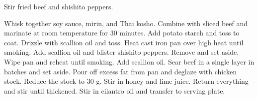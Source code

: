 \documentclass[main]{subfiles}
\begin{document}
Stir fried beef and shishito peppers.

\begin{rec}
Whisk together soy sauce, mirin, and Thai kosho.
Combine with sliced beef and marinate at room temperature for 30 minutes.
Add potato starch and toss to coat.
Drizzle with scallion oil and toss.
Heat cast iron pan over high heat until smoking.
Add scallion oil and blister shishito peppers.
Remove and set aside.
Wipe pan and reheat until smoking.
Add scallion oil.
Sear beef in a single layer in batches and set aside.
Pour off excess fat from pan and deglaze with chicken stock.
Reduce the stock to 30 g.
Stir in honey and lime juice.
Return everything and stir until thickened.
Stir in cilantro oil and transfer to serving plate.
\end{rec}
\end{document}
